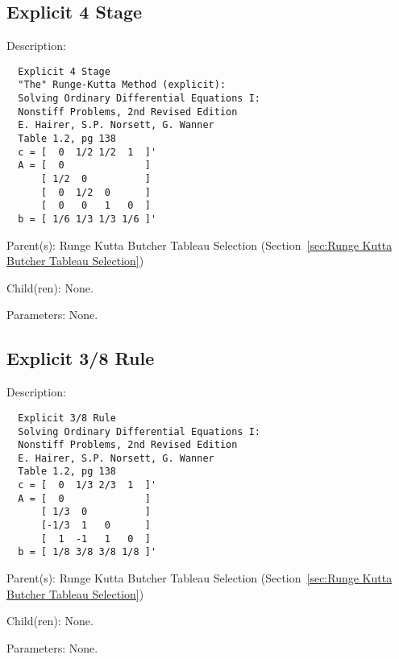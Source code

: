 \subsection{Explicit 4 Stage}
\label{sec:Explicit 4 Stage}

\begin{list}{}
  {\setlength{\leftmargin}{1.0in}
   \setlength{\labelwidth}{0.75in}
   \setlength{\labelsep}{0.125in}}
  \item[Description:]
\begin{verbatim}
  Explicit 4 Stage
  "The" Runge-Kutta Method (explicit):
  Solving Ordinary Differential Equations I:
  Nonstiff Problems, 2nd Revised Edition
  E. Hairer, S.P. Norsett, G. Wanner
  Table 1.2, pg 138
  c = [  0  1/2 1/2  1  ]'
  A = [  0              ]
      [ 1/2  0          ]
      [  0  1/2  0      ]
      [  0   0   1   0  ]
  b = [ 1/6 1/3 1/3 1/6 ]'
\end{verbatim}
  \item[Parent(s):]
    Runge Kutta Butcher Tableau Selection (Section~\ref{sec:Runge Kutta Butcher Tableau Selection})
  \item[Child(ren):]
    None. 
  \item[Parameters:]
    None. 
\end{list}

\subsection{Explicit 3/8 Rule}
\label{sec:Explicit 3/8 Rule}

\begin{list}{}
  {\setlength{\leftmargin}{1.0in}
   \setlength{\labelwidth}{0.75in}
   \setlength{\labelsep}{0.125in}}
  \item[Description:]
\begin{verbatim}
  Explicit 3/8 Rule
  Solving Ordinary Differential Equations I:
  Nonstiff Problems, 2nd Revised Edition
  E. Hairer, S.P. Norsett, G. Wanner
  Table 1.2, pg 138
  c = [  0  1/3 2/3  1  ]'
  A = [  0              ]
      [ 1/3  0          ]
      [-1/3  1   0      ]
      [  1  -1   1   0  ]
  b = [ 1/8 3/8 3/8 1/8 ]'
\end{verbatim}
  \item[Parent(s):]
    Runge Kutta Butcher Tableau Selection (Section~\ref{sec:Runge Kutta Butcher Tableau Selection})
  \item[Child(ren):]
    None. 
  \item[Parameters:]
    None. 
\end{list}

